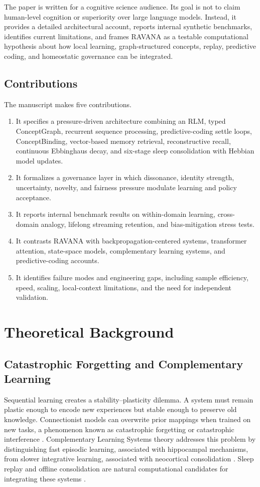 \documentclass[11pt]{article}
\begin{document}
The paper is written for a cognitive science audience. Its goal is not to claim human-level cognition or superiority over large language models. Instead, it provides a detailed architectural account, reports internal synthetic benchmarks, identifies current limitations, and frames RAVANA as a testable computational hypothesis about how local learning, graph-structured concepts, replay, predictive coding, and homeostatic governance can be integrated.

\subsection{Contributions}
The manuscript makes five contributions.
\begin{enumerate}[leftmargin=*]
    \item It specifies a pressure-driven architecture combining an RLM, typed ConceptGraph, recurrent sequence processing, predictive-coding settle loops, ConceptBinding, vector-based memory retrieval, reconstructive recall, continuous Ebbinghaus decay, and six-stage sleep consolidation with Hebbian model updates.
    \item It formalizes a governance layer in which dissonance, identity strength, uncertainty, novelty, and fairness pressure modulate learning and policy acceptance.
    \item It reports internal benchmark results on within-domain learning, cross-domain analogy, lifelong streaming retention, and bias-mitigation stress tests.
    \item It contrasts RAVANA with backpropagation-centered systems, transformer attention, state-space models, complementary learning systems, and predictive-coding accounts.
    \item It identifies failure modes and engineering gaps, including sample efficiency, speed, scaling, local-context limitations, and the need for independent validation.
\end{enumerate}

\section{Theoretical Background}
\subsection{Catastrophic Forgetting and Complementary Learning}
Sequential learning creates a stability--plasticity dilemma. A system must remain plastic enough to encode new experiences but stable enough to preserve old knowledge. Connectionist models can overwrite prior mappings when trained on new tasks, a phenomenon known as catastrophic forgetting or catastrophic interference \cite{mccloskey1989,french1999}. Complementary Learning Systems theory addresses this problem by distinguishing fast episodic learning, associated with hippocampal mechanisms, from slower integrative learning, associated with neocortical consolidation \cite{mcclelland1995,kumaran2016}. Sleep replay and offline consolidation are natural computational candidates for integrating these systems \cite{wilson1994,ji2007,diekelmann2010}.
\end{document}
